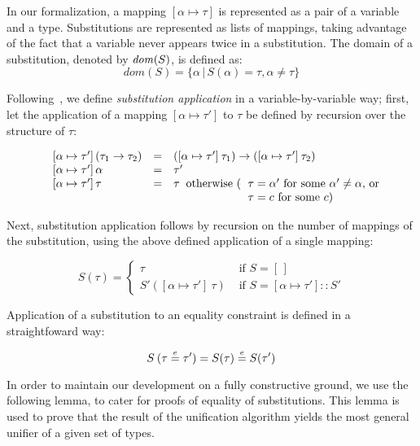 In our formalization, a mapping $[\alpha\mapsto\tau]$ is represented
as a pair of a variable and a type. Substitutions are represented as
lists of mappings, taking advantage of the fact that a variable never
appears twice in a substitution.  The domain of a substitution,
denoted by $\text{\it dom\/}(S)$, is defined as:
\[ dom(S) = \{\alpha\,|\,S(\alpha) = \tau, \alpha\not=\tau\} \]

Following~, we define {\em substitution
  application\/} in a variable-by-variable way; first, let the
application of a mapping $[\alpha\mapsto\tau']$ to $\tau$ be defined
by recursion over the structure of $\tau$:

\[ \begin{array}[t]{llp{.5\textwidth}}
      \symbol{91}\alpha\mapsto \tau'\symbol{93}\,(\tau_1\rightarrow \tau_2) & = &
        $([\alpha\mapsto \tau']\:\tau_1) \to ([\alpha \mapsto \tau']\:\tau_2)$ \\
      \symbol{91}\alpha\mapsto \tau'\symbol{93}\,\alpha & = & $\tau'$ \\
      \symbol{91}\alpha\mapsto \tau'\symbol{93}\,\tau   & = & $\tau$
        \text{ otherwise (\begin{tabular}[t]{l}
                                  $\tau = \alpha'$ for some $\alpha'\not=\alpha$, or \\
                                  $\tau = c$ for some $c$)
                          \end{tabular}}
   \end{array}
\]

Next, substitution application follows by recursion on the number of
mappings of the substitution, using the above defined application of a
single mapping:

\[
   S(\tau) = \left\{
             \begin{array}{ll}
               \tau & \text{ if } S = [\,]\\
              S'([\alpha\mapsto\tau']\:\tau) & \text{ if }S = [\alpha\mapsto\tau'] :: S'
             \end{array}
           \right.
\]

Application of a substitution to an equality constraint is defined in
a straightfoward way:

\[ S\:(\tau\overset{e}{=} \tau') = S(\tau)\overset{e}{=} S(\tau') \]

In order to maintain our development on a fully constructive ground,
we use the following lemma, to cater for proofs of equality of
substitutions. This lemma is used to prove that the result of the
unification algorithm yields the most general unifier of a given set
of types.

